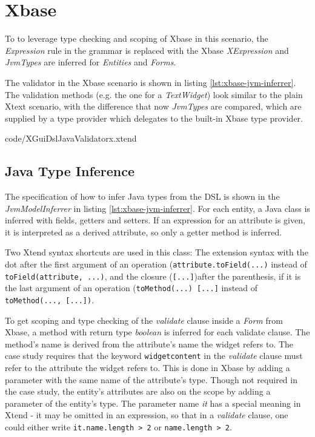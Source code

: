 \section{Xbase}
\label{sec:xbase}

To to leverage type checking and scoping of Xbase in this scenario, the \emph{Expression} rule in the grammar is replaced with the Xbase \emph{XExpression} and \emph{JvmTypes} are inferred for \emph{Entities} and \emph{Forms}.

The validator in the Xbase scenario is shown in listing \ref{lst:xbase-jvm-inferrer}. The validation methods (e.g. the one for a \emph{TextWidget}) look similar to the plain Xtext scenario, with the difference that now \emph{JvmTypes} are compared, which are supplied by a type provider which delegates to the built-in Xbase type provider.

	{code/XGuiDslJavaValidatorx.xtend}

\subsection{Java Type Inference}
The specification of how to infer Java types from the DSL is shown in the \emph{JvmModelInferrer} in listing \ref{lst:xbase-jvm-inferrer}.  For each entity, a Java class is inferred with fields, getters and setters. If an expression for an attribute is given, it is interpreted as a derived attribute, so only a getter method is inferred.

Two Xtend syntax shortcuts are used in this class: The extension syntax with the dot after the first argument of an operation (\verb|attribute.toField(...)| instead of \verb|toField(attribute, ...)|, and the closure (\verb|[...]|)after the parenthesis, if it is the last argument of an operation (\lstinline[basicstyle=\ttfamily]{toMethod(...) [...]} instead of \lstinline[basicstyle=\ttfamily]{toMethod(..., [...])}.

To get scoping and type checking of the \emph{validate} clause inside a \emph{Form} from Xbase, a method with return type \emph{boolean} is inferred for each validate clause. The method's name is derived from the attribute's name the widget refers to. The case study requires that the keyword \verb|widgetcontent| in the \emph{validate} clause must refer to the attribute the widget refers to. This is done in Xbase by adding a parameter with the same name of the attribute's type. Though not required in the case study, the entity's attributes are also on the scope by adding a parameter of the entity's type. The parameter name \emph{it} has a special meaning in Xtend - it may be omitted in an expression, so that in a \emph{validate} clause, one could either write \lstinline[basicstyle=\ttfamily]{it.name.length > 2} or \verb|name.length > 2|.

